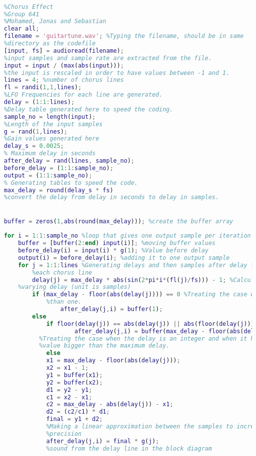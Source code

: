\begin{lstlisting}[language=Matlab, caption= Matlab code for chorus effect]

%Chorus Effect
%Group 641
%Mohamed, Jonas and Sebastian
clear all;
filename = 'guitartune.wav'; %Typing the filename, should be in same 
%directory as the codefile
[input, fs] = audioread(filename);
%input samples and sample rate are extracted from the file.
input = input / (max(abs(input)));
%the input is rescaled in order to have values between -1 and 1.
lines = 4; %number of chorus lines 
fl = randi(1,1,lines);
%LFO Frequencies for each line are generated.
delay = (1:1:lines);
%Delay table generated here to speed the coding. 
sample_no = length(input); 
%Length of the input samples
g = rand(1,lines);
%Gain values generated here
delay_s = 0.0025; 
% Maximum delay in seconds 
after_delay = rand(lines, sample_no); 
before_delay = (1:1:sample_no);
output = (1:1:sample_no);
% Generating tables to speed the code. 
max_delay = round(delay_s * fs)  
%convert the delay from delay in seconds to delay in samples. 


buffer = zeros(1,abs(round(max_delay))); %create the buffer array 
    
for i = 1:1:sample_no %loop that gives one output sample per iteration
    buffer = [buffer(2:end) input(i)]; %moving buffer values
    before_delay(i) = input(i) * g(1); %Value before delay
    output(i) = before_delay(i); %adding it to one output sample
    for j = 1:1:lines %Generating delays and then samples after delay for 
        %each chorus line
        delay(j) = max_delay * abs(sin(2*pi*i*(fl(j)/fs))) - 1; %Calculate time  
    %varying delay (unit is samples)
        if (max_delay - floor(abs(delay(j)))) == 0 %Treating the case where the delay is less 
            %than one.
                after_delay(j,i) = buffer(1);
        else
            if floor(delay(j)) == abs(delay(j)) || abs(floor(delay(j))) >= floor(max_delay)
                    after_delay(j,i) = buffer(max_delay - floor(abs(delay(j)))) * g(j);
          %Treating the case when the delay is an integer and when it has a
          %value bigger than the maximum delay. 
            else
            x1 = max_delay - floor(abs(delay(j)));
            x2 = x1 - 1;
            y1 = buffer(x1);
            y2 = buffer(x2);
            d1 = y2 - y1;
            c1 = x2 - x1;
            c2 = max_delay - abs(delay(j)) - x1;
            d2 = (c2/c1) * d1;
            final = y1 + d2;
            %Making a linear approximation between the samples to increase
            %precision
            after_delay(j,i) = final * g(j);  
            %sound from the delay line in the block diagram
            

\end{lstlisting}
